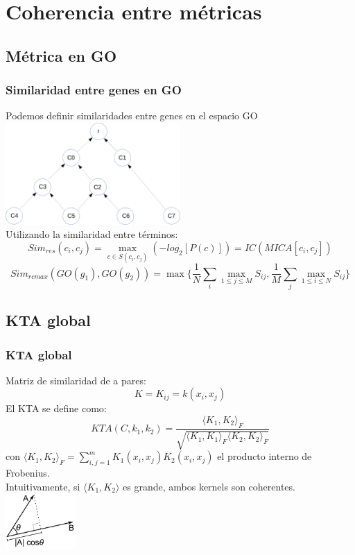 \documentclass[serif,9pt, t]{beamer}
\begin{document}
\section{Coherencia entre métricas}

\subsection{Métrica en GO}
\begin{frame}\frametitle{Similaridad entre genes en GO}
\centering
Podemos definir similaridades entre genes en el espacio GO\\
\bigskip
\includegraphics[width=0.5\textwidth]{dag.pdf}
\\\bigskip
Utilizando la similaridad entre términos:
\begin{equation}
	Sim_{res}(c_i, c_j) = \max\limits_{c \in S(c_i, c_j)}(-log_2[P(c)]) = IC(MICA[c_i, c_j])
\end{equation}
\begin{equation}
	Sim_{rcmax}(GO(g_1), GO(g_2)) = \max\{\frac{1}{N}\sum\limits_{i}\max\limits_{1\leq j \leq M}S_{ij}, \frac{1}{M}\sum\limits_{j}\max\limits_{1\leq i \leq N}S_{ij}\}
\end{equation}
\end{frame}

\subsection{KTA global}
\begin{frame}\frametitle{KTA global} 
Matriz de similaridad de a pares:
\begin{equation}
	K = K_{ij} = k(x_i, x_j)
\end{equation}
\bigskip
El KTA se define como:
\begin{equation}
	KTA(C, k_1, k_2) = \frac{\langle K_1, K_2 \rangle _F}{\sqrt{\langle K_1, K_1 \rangle _F \langle K_2, K_2 \rangle _F}}
\end{equation}
con $\langle K_1, K_2 \rangle _F = \sum_{i,j=1}^m K_1(x_i, x_j)K_2(x_i, x_j)$ el producto interno de Frobenius.\\
Intuitivamente, si $\langle K_1, K_2 \rangle$ es grande, ambos kernels son coherentes.\\
\vspace{20pt}
\hfill
\includegraphics[width=0.2\textwidth]{producto_escalar.png}
\end{frame}
\end{document}
